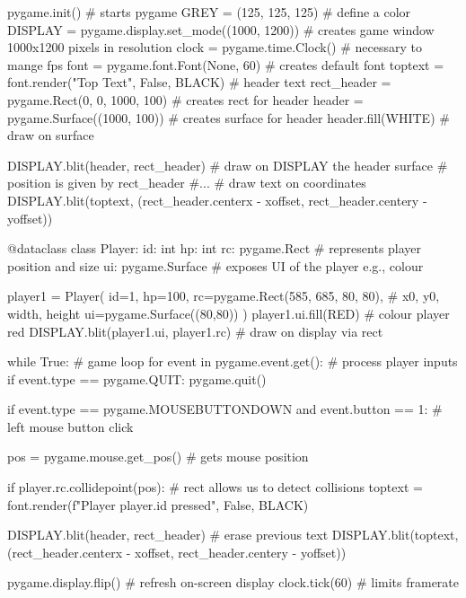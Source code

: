 \begin{python}[label={code:pygameIntro}, caption={Pygame base components}]
pygame.init()                                   # starts pygame
GREY = (125, 125, 125)                          # define a color
DISPLAY = pygame.display.set_mode((1000, 1200)) # creates game window 1000x1200 pixels in resolution
clock = pygame.time.Clock()                     # necessary to mange fps
font = pygame.font.Font(None, 60)               # creates default font 
toptext = font.render("Top Text", False, BLACK) # header text
rect_header = pygame.Rect(0, 0, 1000, 100)      # creates rect for header
header = pygame.Surface((1000, 100))            # creates surface for header
header.fill(WHITE)                              # draw on surface 

DISPLAY.blit(header, rect_header)               # draw on DISPLAY the header surface
                                                # position is given by rect_header                                    
#...
# draw text on coordinates
DISPLAY.blit(toptext, (rect_header.centerx - xoffset, rect_header.centery - yoffset))
\end{python}

\begin{python}[label={code:pygamePlayer}, caption={Players defined as dataclasses that encapsulate Pygame elements}]
@dataclass
class Player:
    id: int
    hp: int
    rc: pygame.Rect     # represents player position and size 
    ui: pygame.Surface  # exposes UI of the player e.g., colour 

player1 = Player(
    id=1,
    hp=100,
    rc=pygame.Rect(585, 685, 80, 80),  # x0, y0, width, height
    ui=pygame.Surface((80,80))
)
player1.ui.fill(RED)                    # colour player red
DISPLAY.blit(player1.ui, player1.rc)    # draw on display via rect
\end{python}

\begin{python}[label={code:pygameLoop}, caption={All interactions and frame-by-frame rendering happen in the game loop}]
while True: # game loop
    for event in pygame.event.get():    # process player inputs
        if event.type == pygame.QUIT:
            pygame.quit()

        if event.type == pygame.MOUSEBUTTONDOWN and event.button == 1:  # left mouse button click

            pos = pygame.mouse.get_pos() # gets mouse position

            if player.rc.collidepoint(pos): # rect allows us to detect collisions
                toptext = font.render(f"Player {player.id} pressed", False, BLACK)

                DISPLAY.blit(header, rect_header)   # erase previous text
                DISPLAY.blit(toptext, (rect_header.centerx - xoffset, rect_header.centery - yoffset))

    pygame.display.flip()  # refresh on-screen display
    clock.tick(60)         # limits framerate
\end{python}

